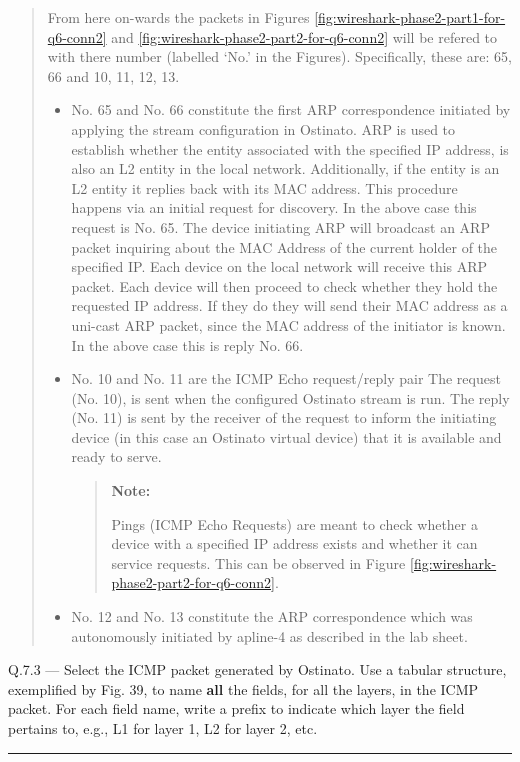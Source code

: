 \documentclass{article}
\newcommand\Que[2]{%
\begin{samepage}
\leavevmode\par
\noindent
Q.#1 --- #2\par\vspace{10pt}\hrule\vspace{10pt}
\end{samepage}}
\newenvironment{ans}
{\fbox{Answer}\begin{quote}\nopagebreak}
{\end{quote}}
\newenvironment{note}{%
\begin{quote}
\begin{tcolorbox}[colback=gray!10,arc=0mm,boxrule=0pt]
\raggedright
\textbf{Note:}%
}{%
\end{tcolorbox}
\end{quote}%
}
\begin{document}
\begin{ans}
From here on-wards the packets in Figures
\ref{fig:wireshark-phase2-part1-for-q6-conn2} and
\ref{fig:wireshark-phase2-part2-for-q6-conn2} will be refered to
with there number (labelled `No.' in the Figures). Specifically,
these are: 65, 66 and 10, 11, 12, 13.

\begin{itemize}
\item No. 65 and No. 66 constitute the first ARP correspondence
    initiated by applying the stream configuration in Ostinato.
    ARP is used to establish whether the entity associated with
    the specified IP address, is also an L2 entity in the local
    network. Additionally, if the entity is an L2 entity it
    replies back with its MAC address. This procedure happens
    via an initial request for discovery. In the above case this
    request is No. 65. The device initiating ARP will broadcast
    an ARP packet inquiring about the MAC Address of the current
    holder of the specified IP. Each device on the local network
    will receive this ARP packet. Each device will then proceed
    to check whether they hold the requested IP address. If they
    do they will send their MAC address as a uni-cast ARP
    packet, since the MAC address of the initiator is known. In
    the above case this is reply No. 66.
\item No. 10 and No. 11 are the ICMP Echo request/reply pair The
    request (No. 10), is sent when the configured Ostinato
    stream is run. The reply (No. 11) is sent by the receiver of
    the request to inform the initiating device (in this case an
    Ostinato virtual device) that it is available and ready to
    serve.
    \begin{note}
    Pings (ICMP Echo Requests) are meant to check whether a
    device with a specified IP address exists and whether it can
    service requests. This can be observed in Figure
    \ref{fig:wireshark-phase2-part2-for-q6-conn2}.
    \end{note}
\item No. 12 and No. 13 constitute the ARP correspondence which
    was autonomously initiated by apline-4 as described in the
    lab sheet.
\end{itemize}
\end{ans}

\newpage

\Que{7.3}{Select the ICMP packet generated by Ostinato. Use a
tabular structure, exemplified by Fig. 39, to name
\textbf{all} the fields, for all the layers, in the ICMP
packet. For each field name, write a prefix to indicate
which layer the field pertains to, e.g., L1 for layer 1,
L2 for layer 2, etc.}
\end{document}
